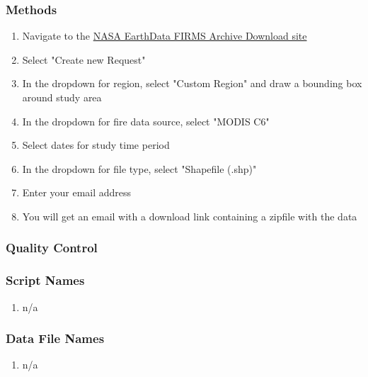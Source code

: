 \subsubsection*{Methods}
\begin{enumerate}
\item Navigate to the \href{https://firms.modaps.eosdis.nasa.gov/download/}{NASA EarthData FIRMS Archive Download site}
\item Select "Create new Request"
\item In the dropdown for region, select "Custom Region" and draw a bounding box around study area
\item In the dropdown for fire data source, select "MODIS C6"
\item Select dates for study time period
\item In the dropdown for file type, select "Shapefile (.shp)"
\item Enter your email address
\item You will get an email with a download link containing a zipfile with the data
\end{enumerate}
\subsubsection*{Quality Control}
\subsubsection*{Script Names}
\begin{enumerate}
\item n/a
\end{enumerate}
\subsubsection*{Data File Names}
\begin{enumerate}
\item n/a
\end{enumerate}